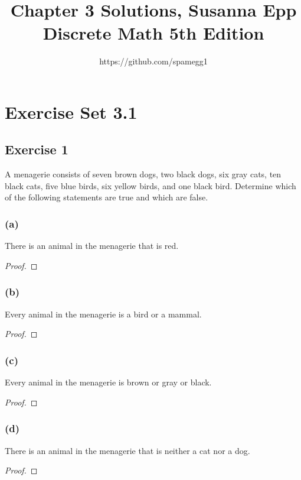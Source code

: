 \documentclass[14pt]{extarticle}
\title{Chapter 3 Solutions, Susanna Epp Discrete Math 5th Edition}
\author{https://github.com/spamegg1}
\begin{document}
\maketitle
\tableofcontents

\section{Exercise Set 3.1}

\subsection{Exercise 1}
A menagerie consists of seven brown dogs, two black dogs, six gray cats, ten black cats, five blue birds, six yellow birds, and one black bird. Determine which of the following statements are true and which are false.

\subsubsection{(a)}
There is an animal in the menagerie that is red.

\begin{proof}

\end{proof}

\subsubsection{(b)}
Every animal in the menagerie is a bird or a mammal.
\begin{proof}

\end{proof}

\subsubsection{(c)}
Every animal in the menagerie is brown or gray or black.
\begin{proof}

\end{proof}

\subsubsection{(d)}
There is an animal in the menagerie that is neither a cat nor a dog.
\begin{proof}

\end{proof}
\end{document}
